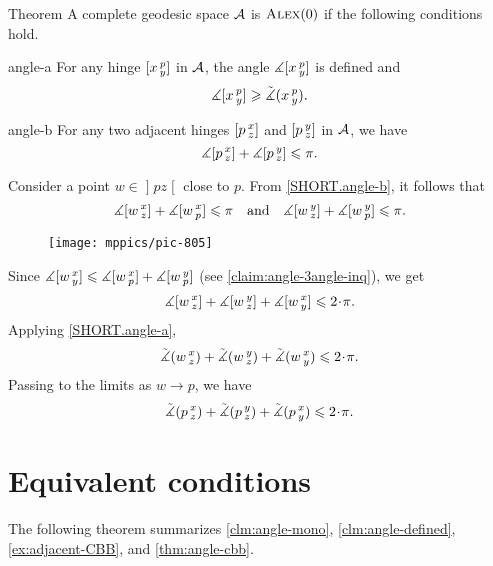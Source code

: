 \begin{thm}{Theorem}\label{thm:angle-cbb}
A complete geodesic space $\mathcal{A}$ is $\textsc{Alex}(0)$ if the following conditions hold.

\begin{subthm}{angle-a}
For any hinge $[x\,{}^{p}_{y}]$ in $\mathcal{A}$, the angle 
$\measuredangle[x\,{}^{p}_{y}]$ is defined and 
\[\measuredangle[x\,{}^{p}_{y}]\geqslant\tilde\measuredangle(x\,{}^{p}_{y}).\]
\end{subthm}

\begin{subthm}{angle-b}
For any two adjacent hinges $[p\,{}^{x}_{z}]$ and $[p\,{}^{y}_{z}]$ in $\mathcal{A}$, we have
\[\measuredangle[p\,{}^{x}_{z}]+\measuredangle[p\,{}^{y}_{z}]\leqslant\pi.\]
\end{subthm}

\end{thm}

Consider a point  $w\in \mathopen{]} p z \mathclose{[}$ close to $p$.
From \ref{SHORT.angle-b}, it follows that 
\[\measuredangle[w\,{}^{x}_{z}]+ \measuredangle[w\,{}^{x}_{p}]\leqslant\pi\quad \text{and}\quad \measuredangle[w\,{}^{y}_{z}] + \measuredangle[w\,{}^{y}_{p}]\leqslant\pi.\]

\begin{wrapfigure}{o}{30 mm}
\vskip-0mm
\centering
\texttt{[image: mppics/pic-805]}
\vskip4mm
\end{wrapfigure}

Since $\measuredangle[w\,{}^{x}_{y}]\leqslant \measuredangle[w\,{}^{x}_{p}] +\measuredangle[w\,{}^{y}_{p}]$ (see \ref{claim:angle-3angle-inq}), we get 
\[\mangle\hinge w x z+ \mangle\hinge w y z +\mangle\hinge w x y
\le
2\cdot\pi.\]
Applying \ref{SHORT.angle-a}, 
\[\angk w x z
+ \angk w y z 
+\angk w x y
\le
2\cdot\pi.\]
Passing to the limits as $w\to p$, we have
\[\angk p x z 
+ \angk p y z 
+\angk p x y
\le
2\cdot\pi.\]
\qedsf

\section{Equivalent conditions}

The following theorem summarizes \ref{clm:angle-mono}, \ref{clm:angle-defined}, \ref{ex:adjacent-CBB}, and \ref{thm:angle-cbb}.

